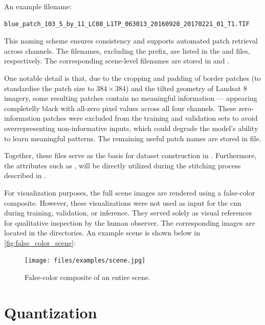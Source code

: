 {An example filename:

\begin{lstlisting}
blue_patch_103_5_by_11_LC08_L1TP_063013_20160920_20170221_01_T1.TIF
\end{lstlisting}

This naming scheme ensures consistency and supports automated patch retrieval across channels.
The filenames, excluding the  prefix, are listed in the  and  files, respectively.
The corresponding scene-level filenames are stored in  and .

One notable detail is that, due to the cropping and padding of border patches (to standardise the patch size to \ensuremath{384\times384}) and the tilted geometry of Landsat 8 imagery,
some resulting patches contain no meaningful information --- appearing completelly black with all-zero pixel values across all four channels.
These zero-information patches were excluded from the training and validation sets to avoid overrepresenting non-informative inputs,
which could degrade the model's ability to learn meaningful patterns.
The remaining useful patch names are stored in  file.

Together, these  files serve as the basis for dataset construction in .
Furthermore, the attributes such as ,  will be directly utilized during the stitching process described in .

For visualization purposes, the full scene images are rendered using a false-color composite.
However, these visualizations were not used as input for the \gls{cnn} during training, validation, or inference.
They served solely as visual references for qualitative inspection by the human observer.
The corresponding images are located in the  directories.
An example scene is shown below in \autoref{fig:false_color_scene}: 

\begin{figure}[H]
  \centering
  \texttt{[image: files/examples/scene.jpg]}
  \caption{False-color composite of an entire scene.}
  \label{fig:false_color_scene}
\end{figure}


\section{Quantization}
\label{subsec:quantization}

}
